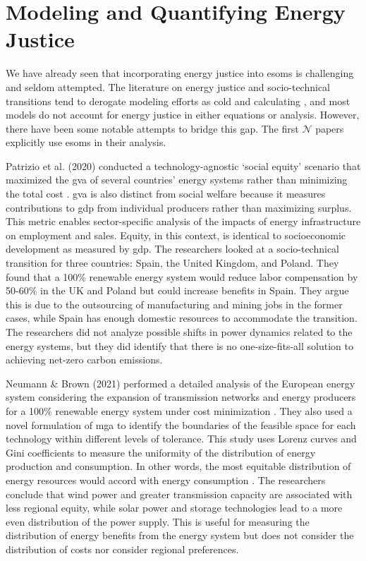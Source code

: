 \section{Modeling and Quantifying Energy Justice}

We have already seen that incorporating energy justice into \acp{esom} is
challenging and seldom attempted. The literature on energy justice and
socio-technical transitions tend to derogate modeling efforts as cold and
calculating \cite{sovacool_energy_2015,sovacool_energy_2016}, and most models do
not account for energy justice in either equations or analysis. However, there
have been some notable attempts to bridge this gap. The first $\mathcal{N}$
papers explicitly use \acp{esom} in their analysis.

Patrizio et al. (2020) conducted a technology-agnostic `social equity' scenario
that maximized the \ac{gva} of several countries' energy systems rather than
minimizing the total cost \cite{patrizio_socially_2020}. \Ac{gva} is also
distinct from social welfare because it measures contributions to \ac{gdp} from
individual producers rather than maximizing surplus. This metric enables
sector-specific analysis of the impacts of energy infrastructure on employment
and sales. Equity, in this context, is identical to socioeconomic development as
measured by \ac{gdp}. The researchers looked at a socio-technical transition for
three countries: Spain, the United Kingdom, and Poland. They found that a 100\%
renewable energy system would reduce labor compensation by 50-60\% in the UK and
Poland but could increase benefits in Spain. They argue this is due to the
outsourcing of manufacturing and mining jobs in the former cases, while Spain
has enough domestic resources to accommodate the transition. The researchers did
not analyze possible shifts in power dynamics related to the energy systems, but
they did identify that there is no one-size-fits-all solution to achieving
net-zero carbon emissions.

Neumann \& Brown (2021) performed a detailed analysis of the European energy
system considering the expansion of transmission networks and energy producers
for a 100\% renewable energy system under cost minimization
\cite{neumann_near-optimal_2021}. They also used a novel formulation of \ac{mga}
to identify the boundaries of the feasible space for each technology within
different levels of tolerance. This study uses Lorenz curves and Gini
coefficients to measure the uniformity of the distribution of energy production
and consumption. In other words, the most equitable distribution of energy
resources would accord with energy consumption \cite{neumann_near-optimal_2021}.
The researchers conclude that wind power and greater transmission capacity are
associated with less regional equity, while solar power and storage technologies
lead to a more even distribution of the power supply. This is useful for
measuring the distribution of energy benefits from the energy system but does
not consider the distribution of costs nor consider regional preferences. 


